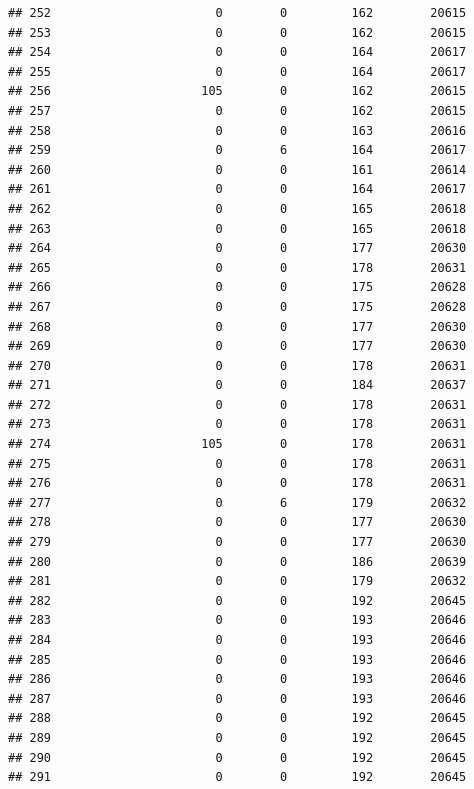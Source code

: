 \documentclass[
]{article}
\begin{document}
\begin{verbatim}
## 252                       0        0         162        20615
## 253                       0        0         162        20615
## 254                       0        0         164        20617
## 255                       0        0         164        20617
## 256                     105        0         162        20615
## 257                       0        0         162        20615
## 258                       0        0         163        20616
## 259                       0        6         164        20617
## 260                       0        0         161        20614
## 261                       0        0         164        20617
## 262                       0        0         165        20618
## 263                       0        0         165        20618
## 264                       0        0         177        20630
## 265                       0        0         178        20631
## 266                       0        0         175        20628
## 267                       0        0         175        20628
## 268                       0        0         177        20630
## 269                       0        0         177        20630
## 270                       0        0         178        20631
## 271                       0        0         184        20637
## 272                       0        0         178        20631
## 273                       0        0         178        20631
## 274                     105        0         178        20631
## 275                       0        0         178        20631
## 276                       0        0         178        20631
## 277                       0        6         179        20632
## 278                       0        0         177        20630
## 279                       0        0         177        20630
## 280                       0        0         186        20639
## 281                       0        0         179        20632
## 282                       0        0         192        20645
## 283                       0        0         193        20646
## 284                       0        0         193        20646
## 285                       0        0         193        20646
## 286                       0        0         193        20646
## 287                       0        0         193        20646
## 288                       0        0         192        20645
## 289                       0        0         192        20645
## 290                       0        0         192        20645
## 291                       0        0         192        20645

\end{verbatim}
\end{document}
